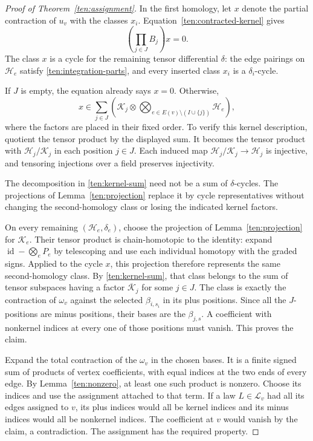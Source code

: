 \begin{proof}[Proof of Theorem~\ref{ten:assignment}]
In the first homology, let \(x\) denote the partial contraction of
\(u_v\) with the classes \(x_i\).  Equation~\eqref{ten:contracted-kernel}
gives
\[
 \left(\prod_{j\in J}B_j\right)x=0.
\]
The class \(x\) is a cycle for the
remaining tensor differential \(\delta\): the edge pairings on
\(\mathcal H_e\) satisfy \eqref{ten:integration-parts}, and every
inserted class \(x_i\) is a \(\delta_i\)-cycle.

If \(J\) is empty, the equation already says \(x=0\).  Otherwise,
\begin{equation}\label{ten:kernel-sum}
 x\in\sum_{j\in J}
 \left(\mathcal K_j\otimes
         \bigotimes_{e\in E(v)\setminus(I\cup\{j\})}\mathcal H_e\right),
\end{equation}
where the factors are placed in their fixed order.  To verify this kernel
description, quotient the tensor product by the displayed sum.  It becomes
the tensor product with \(\mathcal H_j/\mathcal K_j\) in each position
\(j\in J\).  Each induced map
\(\mathcal H_j/\mathcal K_j\to\mathcal H_j\) is injective, and tensoring
injections over a field preserves injectivity.

The decomposition in \eqref{ten:kernel-sum} need not be a sum of
\(\delta\)-cycles.  The projections of Lemma~\ref{ten:projection}
replace it by cycle representatives without changing the second-homology
class or losing the indicated kernel factors.

On every remaining \((\mathcal H_e,\delta_e)\), choose the projection
of Lemma~\ref{ten:projection} for \(\mathcal K_e\).  Their tensor
product is chain-homotopic to the identity: expand
\(\operatorname{id}-\bigotimes_eP_e\) by telescoping and use each
individual homotopy with the graded signs.  Applied to the cycle \(x\),
this projection therefore represents the same second-homology class.
By \eqref{ten:kernel-sum}, that class belongs to the sum of tensor
subspaces having a factor \(\overline{\mathcal K}_j\) for some
\(j\in J\).  The class is exactly the contraction of \(\omega_v\)
against the selected \(\beta_{i,s_i}\) in its plus positions.  Since
all the \(J\)-positions are minus positions, their bases are the
\(\beta_{j,s}\).  A coefficient with nonkernel indices at every one
of those positions must vanish.  This proves the claim.

Expand the total contraction of the \(\omega_v\) in the chosen bases.
It is a finite signed sum of products of vertex coefficients, with
equal indices at the two ends of every edge.  By
Lemma~\ref{ten:nonzero}, at least one such product is nonzero.  Choose
its indices and use the assignment attached to that term.  If a law
\(L\in\mathcal L_v\) had all its edges assigned to \(v\), its plus
indices would all be kernel indices and its minus indices would all
be nonkernel indices.  The coefficient at \(v\) would vanish by the
claim, a contradiction.  The assignment has the required property.
\end{proof}
